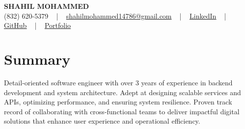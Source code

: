 \documentclass[letterpaper,10pt]{article}
\begin{document}
\begin{center}
    {\fontsize{14pt}{12pt}\selectfont \textbf{\MakeUppercase{Shahil Mohammed}}}\\ \vspace{2pt}
    \fontsize{10pt}{12pt}\selectfont (832) 620-5379 ~ | ~ \href{mailto:shahilmohammed14786@gmail.com}{shahilmohammed14786@gmail.com} ~ | ~  
    \href{https://www.linkedin.com/in/shahil-mohammed-9652931a1/}{\color{blue}\underline{LinkedIn}}  ~ | ~ 
    \href{https://github.com/freakbeast14}{\color{blue}\underline{GitHub}} ~ | ~ 
    \href{https://shahil-mohammed.netlify.app/}{\color{blue}\underline{Portfolio}}
    \vspace{-8pt}
\end{center}

\section{Summary}
\vspace{-2pt}\fontsize{8pt}{9pt}\selectfont
Detail-oriented software engineer with over 3 years of experience in backend development and system architecture. Adept at designing scalable services and APIs, optimizing performance, and ensuring system resilience. Proven track record of collaborating with cross-functional teams to deliver impactful digital solutions that enhance user experience and operational efficiency.
 \vspace{-5pt}
 
\vspace{-2pt}
\end{document}
